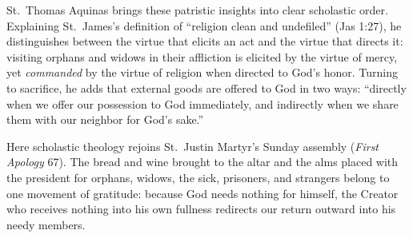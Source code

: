 St.\ Thomas Aquinas brings these patristic insights into clear scholastic order. Explaining St.\ James's definition of ``religion clean and undefiled'' (Jas 1:27), he distinguishes between the virtue that elicits an act and the virtue that directs it: visiting orphans and widows in their affliction is elicited by the virtue of mercy, yet \emph{commanded} by the virtue of religion when directed to God's honor. Turning to sacrifice, he adds that external goods are offered to God in two ways: ``directly when we offer our possession to God immediately, and indirectly when we share them with our neighbor for God's sake.''

Here scholastic theology rejoins St.\ Justin Martyr's Sunday assembly (\emph{First Apology} 67). The bread and wine brought to the altar and the alms placed with the president for orphans, widows, the sick, prisoners, and strangers belong to one movement of gratitude: because God needs nothing for himself, the Creator who receives nothing into his own fullness redirects our return outward into his needy members.
